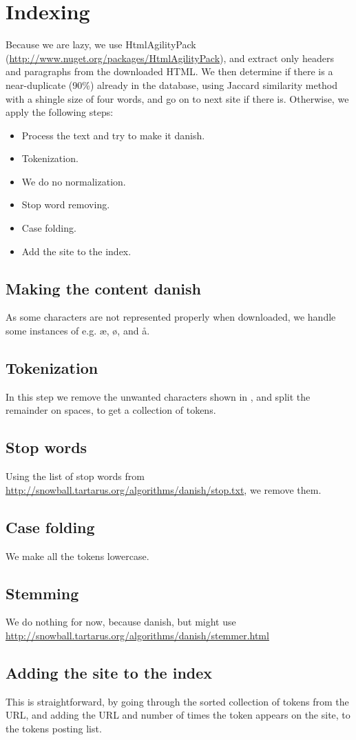 \section{Indexing}
Because we are lazy, we use HtmlAgilityPack (\url{http://www.nuget.org/packages/HtmlAgilityPack}), and extract only headers and paragraphs from the downloaded HTML. We then determine if there is a near-duplicate (90\%) already in the database, using Jaccard similarity method with a shingle size of four words, and go on to next site if there is. Otherwise, we apply the following steps:

\begin{itemize}
    \item Process the text and try to make it danish.
	\item Tokenization.
    \item We do no normalization.
	\item Stop word removing.
	\item Case folding.
    \item Add the site to the index.
\end{itemize}

\subsection{Making the content danish}
As some characters are not represented properly when downloaded, we handle some instances of e.g. æ, ø, and å.

\subsection{Tokenization}
In this step we remove the unwanted characters shown in , and split the remainder on spaces, to get a collection of tokens.

\subsection{Stop words}
Using the list of stop words from \url{http://snowball.tartarus.org/algorithms/danish/stop.txt}, we remove them.

\subsection{Case folding}
We make all the tokens lowercase.

\subsection{Stemming}
We do nothing for now, because danish, but might use \url{http://snowball.tartarus.org/algorithms/danish/stemmer.html}

\subsection{Adding the site to the index}
This is straightforward, by going through the sorted collection of tokens from the URL, and adding the URL and number of times the token appears on the site, to the tokens posting list.